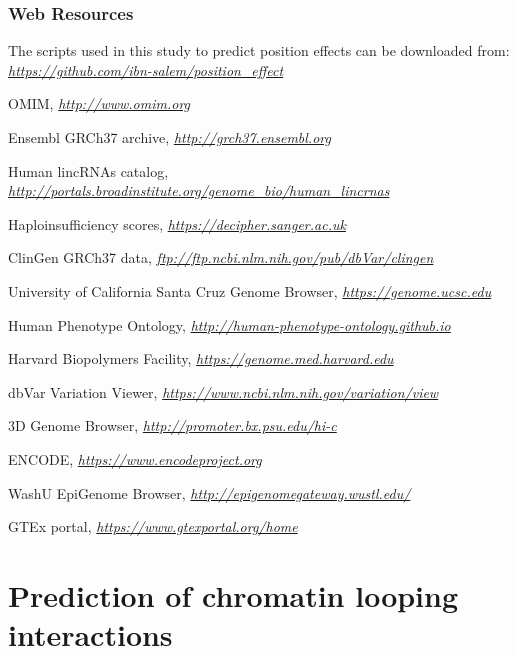 \documentclass[a4paper,twoside=true,openright,parskip=full,chapterprefix=true,11pt,headings=normal,bibliography=totoc,listof=totoc,titlepage=on,captions=tableabove,draft=false]{scrreprt}
\theoremstyle{definition}
\theoremstyle{definition}
\theoremstyle{definition}
\theoremstyle{remark}
\begin{document}
\hypertarget{web-resources}{%
\subsection*{Web Resources}\label{web-resources}}

The scripts used in this study to predict position effects can be
downloaded from:
\href{https://github.com/ibn-salem/position_effect}{\emph{https://github.com/ibn-salem/position\_effect}}

OMIM, \href{http://www.omim.org/}{\emph{http://www.omim.org}}

Ensembl GRCh37 archive,
\href{http://grch37.ensembl.org/}{\emph{http://grch37.ensembl.org}}

Human lincRNAs catalog,
\href{http://portals.broadinstitute.org/genome_bio/human_lincrnas}{\emph{http://portals.broadinstitute.org/genome\_bio/human\_lincrnas}}

Haploinsufficiency scores,
\href{https://decipher.sanger.ac.uk/}{\emph{https://decipher.sanger.ac.uk}}

ClinGen GRCh37 data,
\href{ftp://ftp.ncbi.nlm.nih.gov/pub/dbVar/clingen}{\emph{ftp://ftp.ncbi.nlm.nih.gov/pub/dbVar/clingen}}

University of California Santa Cruz Genome Browser,
\href{https://genome.ucsc.edu/}{\emph{https://genome.ucsc.edu}}

Human Phenotype Ontology,
\href{http://human-phenotype-ontology.github.io/}{\emph{http://human-phenotype-ontology.github.io}}

Harvard Biopolymers Facility,
\href{https://genome.med.harvard.edu/}{\emph{https://genome.med.harvard.edu}}

dbVar Variation Viewer,
\href{https://www.ncbi.nlm.nih.gov/variation/view}{\emph{https://www.ncbi.nlm.nih.gov/variation/view}}

3D Genome Browser,
\href{http://promoter.bx.psu.edu/hi-c}{\emph{http://promoter.bx.psu.edu/hi-c}}

ENCODE,
\href{https://www.encodeproject.org/}{\emph{https://www.encodeproject.org}}

WashU EpiGenome Browser,
\href{http://epigenomegateway.wustl.edu/}{\emph{http://epigenomegateway.wustl.edu/}}

GTEx portal,
\href{https://www.gtexportal.org/home}{\emph{https://www.gtexportal.org/home}}

\hypertarget{loop}{%
\chapter{Prediction of chromatin looping interactions}\label{loop}}
\end{document}
